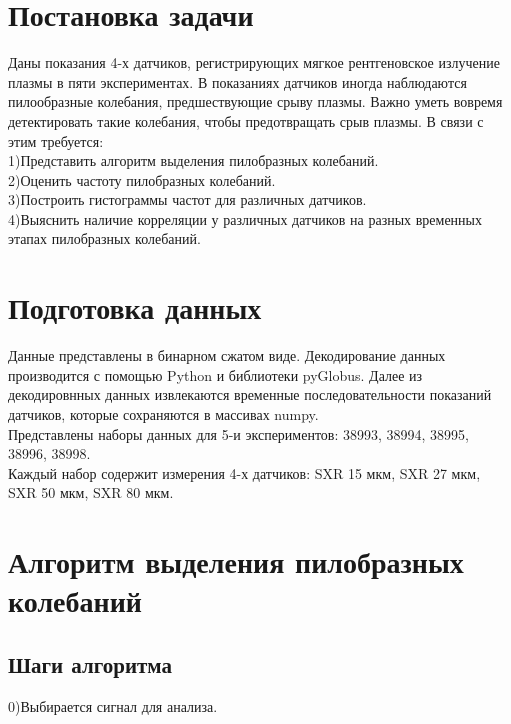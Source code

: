 \documentclass[a4]{article}
\begin{document}
	
	\newpage
	\tableofcontents{}
	\newpage
	\listoffigures
	\newpage
	
	
	\section{Постановка задачи}
	Даны показания 4-х датчиков, регистрирующих мягкое рентгеновское излучение плазмы в пяти экспериментах. В показаниях датчиков иногда наблюдаются пилообразные колебания, предшествующие срыву плазмы. Важно уметь вовремя детектировать такие колебания, чтобы предотвращать срыв плазмы. В связи с этим требуется:\\
	
	1)Представить алгоритм выделения пилобразных колебаний.\\
	
	2)Оценить частоту пилобразных колебаний.\\
	
	3)Построить гистограммы частот для различных датчиков.\\
	
	4)Выяснить наличие корреляции у различных датчиков на разных временных этапах пилобразных колебаний.\\
	
	\section{Подготовка данных}
	Данные представлены в бинарном сжатом виде. Декодирование данных производится с помощью Python и библиотеки pyGlobus. Далее из декодировнных данных извлекаются временные последовательности показаний датчиков, которые сохраняются в массивах numpy.\\
	
	Представлены наборы данных для 5-и экспериментов: 38993, 38994, 38995, 38996, 38998.\\
	
	Каждый набор содержит измерения 4-х датчиков: SXR 15 мкм, SXR 27 мкм, SXR 50 мкм, SXR 80 мкм.
	
	\section{Алгоритм выделения пилобразных колебаний}
	\subsection{Шаги алгоритма}
		0)Выбирается сигнал для анализа.\\
		
\end{document}
